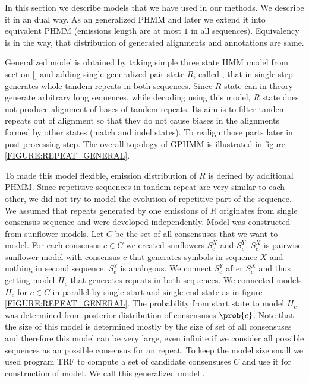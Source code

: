 In this section we describe models that we have used in our methods. We
describe it in an dual way. As an generalized PHMM and later we extend it into
equivalent PHMM (emissions length are at most $1$ in all sequences).
Equivalency is in the way, that distribution of generated alignments and
annotations are same.

Generalized model is obtained by taking simple three state HMM model from
section \ref{} and adding single generalized pair state $R$, called
, that in single step generates whole tandem repeats
in both sequences. Since $R$ state can in theory generate arbitrary long
sequences, while decoding using this model, $R$ state does not produce
alignment of bases of tandem repeats. Its aim is to filter tandem repeats out
of alignment so that they do not cause biases in the alignments formed by other
states (match and indel states). To realign those parts later in
post-processing step. The overall topology of GPHMM is illustrated in figure
\ref{FIGURE:REPEAT_GENERAL}.

To made this model flexible, emission distribution of $R$ is defined by
additional PHMM. Since repetitive sequences in tandem repeat are very similar
to each other, we did not try to model the evolution of repetitive part of the
sequence. We assumed that repeats generated by one emissions of $R$ originates
from single consensus sequence and were developed independently. Model was
constructed from sunflower models. Let $C$ be the set of all consensuses that
we want to model. For each consensus $c\in C$ we created sunflowers $S_c^X$ and
$S_c^Y$.  $S_c^X$ is pairwise sunflower model with consensus $c$ that generates
symbols in sequence $X$ and nothing in second sequence. $S_c^Y$ is analogous.
We connect $S_c^Y$ after $S_c^X$ and thus getting model $H_c$ that generates
repeats in both sequences. We connected models $H_c$ for $c\in C$ in parallel
by single start and single end state as in figure \ref{FIGURE:REPEAT_GENERAL}.
The probability from start state to model $H_c$ was determined from posterior
distribution of consensuses $\prob{c}$. Note that the size of this model is
determined mostly by the size of set of all consensuses and therefore this
model can be very large, even infinite if we consider all possible sequences as
an possible consensus for an repeat. To keep the model size small we used
program TRF to compute a set of candidate consensuses $C$ and use it for
construction of model.  We call this generalized model .


